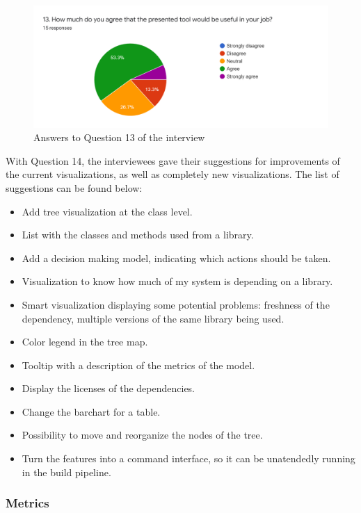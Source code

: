 \begin{figure}[ht]
\begin{center}
\includegraphics[width=\textwidth]{figures/interview/Question13.png}
\caption{Answers to Question 13 of the interview}
\label{fig:interview-13}
\end{center}
\end{figure}

With Question 14, the interviewees gave their suggestions for improvements of the current visualizations, as well as completely new visualizations. The list of suggestions can be found below:

\begin{itemize}
  \item Add tree visualization at the class level.
  \item List with the classes and methods used from a library.
  \item Add a decision making model, indicating which actions should be taken.
  \item Visualization to know how much of my system is depending on a library.
  \item Smart visualization displaying some potential problems: freshness of the dependency, multiple versions of the same library being used.
  \item Color legend in the tree map.
  \item Tooltip with a description of the metrics of the model.
  \item Display the licenses of the dependencies.
  \item Change the barchart for a table.
  \item Possibility to move and reorganize the nodes of the tree.
  \item Turn the features into a command interface, so it can be unatendedly running in the build pipeline.
\end{itemize}

\subsubsection{Metrics}

